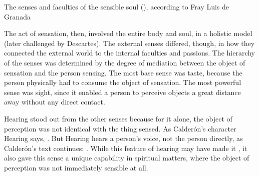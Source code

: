 
\begin{table}
    \caption{The senses and faculties of the sensible soul (), according to Fray Luis de Granada}
    \label{tab:senses-fray-luis}
\end{table}

The act of sensation, then, involved the entire body and soul, in a holistic
model (later challenged by Descartes).
The external senses differed, though, in how they connected the external world
to the internal faculties and passions.
The hierarchy of the senses was determined by the degree of mediation between
the object of sensation and the person sensing.
The most base sense was taste, because the person physically had to consume
the object of sensation.
The most powerful sense was sight, since it enabled a person to perceive objects
a great distance away without any direct contact.


Hearing stood out from the other senses because for it alone, the object of
perception was not identical with the thing sensed.
As Calderón's character Hearing says, .%
    \Autocite[]{Calderon:Retiro}
But Hearing hears a person's voice, not the person directly, as Calderón's text
continues: .%
    \Autocite[]{Calderon:Retiro}
While this feature of hearing may have made it , it also
gave this sense a unique capability in spiritual matters, where the object of
perception was not immediately sensible at all.

